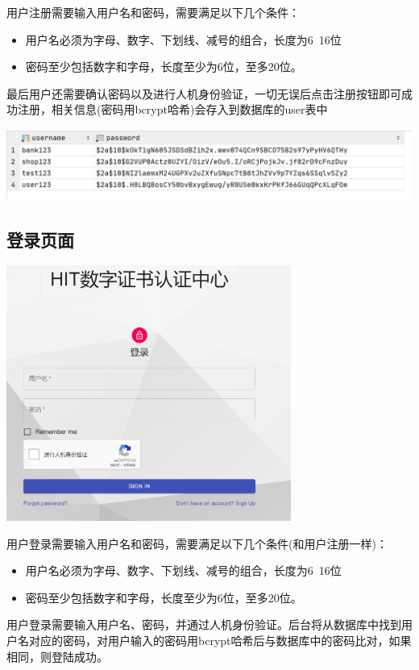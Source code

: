 \documentclass{ctexart}
\begin{document}
用户注册需要输入用户名和密码，需要满足以下几个条件：
\begin{itemize}
    \item 用户名必须为字母、数字、下划线、减号的组合，长度为6~16位
    \item 密码至少包括数字和字母，长度至少为6位，至多20位。
\end{itemize}
最后用户还需要确认密码以及进行人机身份验证，一切无误后点击注册按钮即可成功注册，相关信息(密码用bcrypt哈希)会存入到数据库的user表中


\includegraphics[width=\textwidth]{Clipboard_2021-01-01-10-56-30.png}

\subsection{登录页面}

\includegraphics[width=0.7\textwidth]{login_page.png}

用户登录需要输入用户名和密码，需要满足以下几个条件(和用户注册一样)：
\begin{itemize}
    \item 用户名必须为字母、数字、下划线、减号的组合，长度为6~16位
    \item 密码至少包括数字和字母，长度至少为6位，至多20位。
\end{itemize}
用户登录需要输入用户名、密码，并通过人机身份验证。后台将从数据库中找到用户名对应的密码，对用户输入的密码用bcrypt哈希后与数据库中的密码比对，如果相同，则登陆成功。\\
\end{document}
